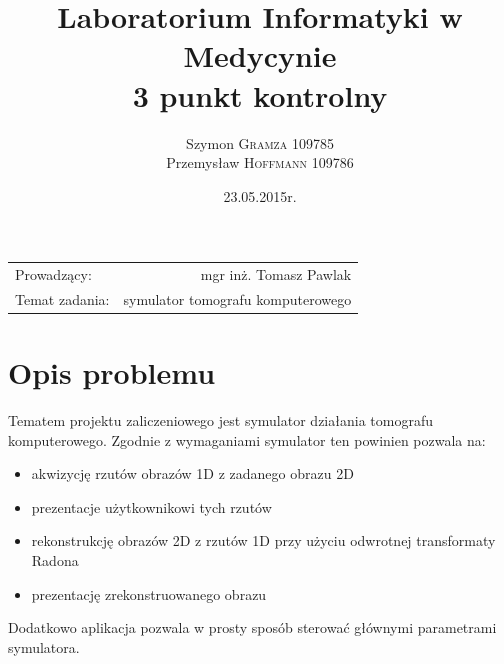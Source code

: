 \documentclass[A_4paper,12pt]{article}
\title{Laboratorium Informatyki w Medycynie \\ 3 punkt kontrolny} %
\author{Szymon \textsc{Gramza} 109785  \\ Przemysław \textsc{Hoffmann} 109786} %
\date{23.05.2015r.} %
\begin{document}
\maketitle %

\begin{center}
\begin{tabular}{l r}
Prowadzący: & mgr inż. Tomasz Pawlak \\
Temat zadania: & symulator tomografu komputerowego
\end{tabular}
\end{center}

\newpage

\section{Opis problemu}
Tematem projektu zaliczeniowego jest symulator działania tomografu komputerowego.
Zgodnie z wymaganiami symulator ten powinien pozwala na:
\begin{itemize}
\item akwizycję rzutów obrazów 1D z zadanego obrazu 2D
\item prezentacje użytkownikowi tych rzutów
\item rekonstrukcję obrazów 2D z rzutów 1D przy użyciu odwrotnej transformaty Radona
\item prezentację zrekonstruowanego obrazu
\end{itemize}
Dodatkowo aplikacja pozwala w prosty sposób sterować głównymi parametrami symulatora.
\end{document}
